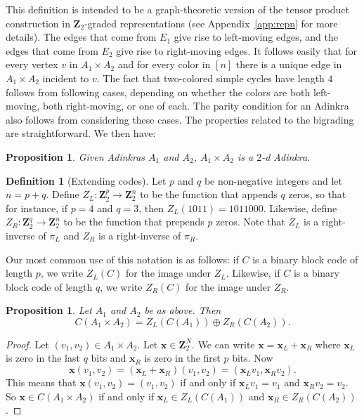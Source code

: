 \documentclass[12pt,twoside,singlespace]{article}
\numberwithin{equation}{section}
\newtheorem{prop}[equation]{Proposition}
\theoremstyle{definition}
\newtheorem{definition}[equation]{Definition}
\newcommand{\ZZ}{\mathbf{Z}}
\renewcommand{\vec}[1]{\mathbf{#1}}
\begin{document}
This definition is intended to be a graph-theoretic version of the tensor product construction in $\ZZ_2$-graded representations (see Appendix~\ref{app:repn} for more details).  The edges that come from $E_1$ give rise to left-moving edges, and the edges that come from $E_2$ give rise to right-moving edges.  It follows easily that for every vertex $v$ in $A_1\times A_2$ and for every color in $[n]$ there is a unique edge in $A_1\times A_2$ incident to $v$.  The fact that two-colored simple cycles have length $4$ follows from following cases, depending on whether the colors are both left-moving, both right-moving, or one of each.  The parity condition for an Adinkra also follows from considering these cases.  The properties related to the bigrading are straightforward.  We then have:

\begin{prop}
\label{prop:product-admissable}
Given Adinkras $A_1$ and $A_2$, $A_1\times A_2$ is a $2$-d Adinkra.
\end{prop}


\begin{definition}[Extending codes]
Let $p$ and $q$ be non-negative integers and let $n=p+q$.  Define $Z_L:\ZZ_2^p\to\ZZ_2^n$ to be the function that appends $q$ zeros, so that for instance, if $p=4$ and $q=3$, then $Z_L(1011)=1011000$.  Likewise, define $Z_R:\ZZ_2^q\to\ZZ_2^n$ to be the function that prepends $p$ zeros.  Note that $Z_L$ is a right-inverse of $\pi_L$ and $Z_R$ is a right-inverse of $\pi_R$.

Our most common use of this notation is as follows: if $C$ is a binary block code of length $p$, we write $Z_L(C)$ for the image under $Z_L$.  Likewise, if $C$ is a binary block code of length $q$, we write $Z_R(C)$ for the image under $Z_R$.
\end{definition}

\begin{prop}
\label{prop:prodcode}
Let $A_1$ and $A_2$ be as above.  Then
\[C(A_1\times A_2)=Z_L(C(A_1))\oplus Z_R(C(A_2)).\]
\end{prop}
\begin{proof}
Let $(v_1,v_2)\in A_1\times A_2$.  Let $\vec{x}\in \ZZ_2^N$.  We can write $\vec{x}=\vec{x}_L+\vec{x}_R$ where $\vec{x}_L$ is zero in the last $q$ bits and $\vec{x}_R$ is zero in the first $p$ bits.  Now
\[\vec{x}(v_1,v_2)=(\vec{x}_L+\vec{x}_R)(v_1,v_2)=(\vec{x}_Lv_1,\vec{x}_Rv_2).\]
This means that $\vec{x}(v_1,v_2)=(v_1,v_2)$ if and only if $\vec{x}_Lv_1=v_1$ and $\vec{x}_R v_2=v_2$. So $\vec{x}\in C(A_1\times A_2)$ if and only if $\vec{x}_L\in Z_L(C(A_1))$ and $\vec{x}_R\in Z_R(C(A_2))$.
\end{proof}
\end{document}
